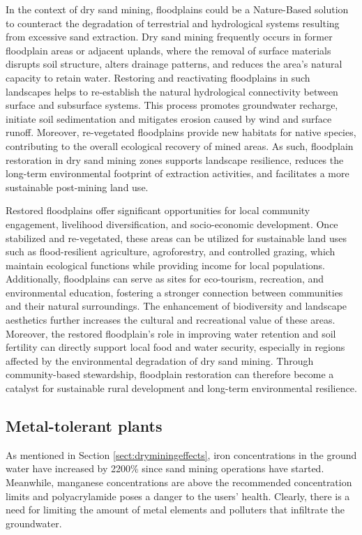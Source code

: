 In the context of dry sand mining, floodplains could be a Nature-Based solution to counteract the degradation of terrestrial and hydrological systems resulting from excessive sand extraction. Dry sand mining frequently occurs in former floodplain areas or adjacent uplands, where the removal of surface materials disrupts soil structure, alters drainage patterns, and reduces the area’s natural capacity to retain water. Restoring and reactivating floodplains in such landscapes helps to re-establish the natural hydrological connectivity between surface and subsurface systems. This process promotes groundwater recharge, initiate soil sedimentation and mitigates erosion caused by wind and surface runoff. Moreover, re-vegetated floodplains provide new habitats for native species, contributing to the overall ecological recovery of mined areas. As such, floodplain restoration in dry sand mining zones supports landscape resilience, reduces the long-term environmental footprint of extraction activities, and facilitates a more sustainable post-mining land use.

Restored floodplains offer significant opportunities for local community engagement, livelihood diversification, and socio-economic development. Once stabilized and re-vegetated, these areas can be utilized for sustainable land uses such as flood-resilient agriculture, agroforestry, and controlled grazing, which maintain ecological functions while providing income for local populations. Additionally, floodplains can serve as sites for eco-tourism, recreation, and environmental education, fostering a stronger connection between communities and their natural surroundings. The enhancement of biodiversity and landscape aesthetics further increases the cultural and recreational value of these areas. Moreover, the restored floodplain’s role in improving water retention and soil fertility can directly support local food and water security, especially in regions affected by the environmental degradation of dry sand mining. Through community-based stewardship, floodplain restoration can therefore become a catalyst for sustainable rural development and long-term environmental resilience.

\subsection{Metal-tolerant plants}
As mentioned in Section \ref{sect:dryminingeffects}, iron concentrations in the ground water have increased by 2200\% since sand mining operations have started. Meanwhile, manganese concentrations are above the recommended concentration limits and polyacrylamide poses a danger to the users' health. Clearly, there is a need for limiting the amount of metal elements and polluters that infiltrate the groundwater.

